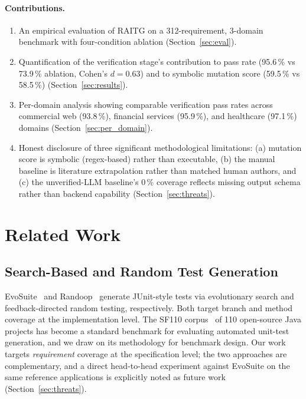 \documentclass[10pt,twocolumn,letterpaper]{article}
\begin{document}
\paragraph{Contributions.}

\begin{enumerate}
  \item An empirical evaluation of RAITG on a 312-requirement,
        3-domain benchmark with four-condition ablation
        (Section~\ref{sec:eval}).
  \item Quantification of the verification stage's contribution to
        pass rate (95.6\,\% vs 73.9\,\% ablation, Cohen's $d = 0.63$)
        and to symbolic mutation score (59.5\,\% vs 58.5\,\%)
        (Section~\ref{sec:results}).
  \item Per-domain analysis showing comparable verification pass
        rates across commercial web (93.8\,\%), financial services
        (95.9\,\%), and healthcare (97.1\,\%) domains
        (Section~\ref{sec:per_domain}).
  \item Honest disclosure of three significant methodological
        limitations: (a) mutation score is symbolic (regex-based)
        rather than executable, (b) the manual baseline is literature
        extrapolation rather than matched human authors, and (c) the
        unverified-LLM baseline's 0\,\% coverage reflects missing
        output schema rather than backend capability
        (Section~\ref{sec:threats}).
\end{enumerate}

\section{Related Work}
\label{sec:related}

\subsection{Search-Based and Random Test Generation}

EvoSuite~\citep{fraser2015sf110} and Randoop~\citep{pacheco2007randoop}
generate JUnit-style tests via evolutionary search and
feedback-directed random testing, respectively. Both target branch
and method coverage at the implementation level. The SF110
corpus~\citep{fraser2015sf110} of 110 open-source Java projects has
become a standard benchmark for evaluating automated unit-test
generation, and we draw on its methodology for benchmark design. Our
work targets \emph{requirement} coverage at the specification level;
the two approaches are complementary, and a direct head-to-head
experiment against EvoSuite on the same reference applications is
explicitly noted as future work (Section~\ref{sec:threats}).
\end{document}
